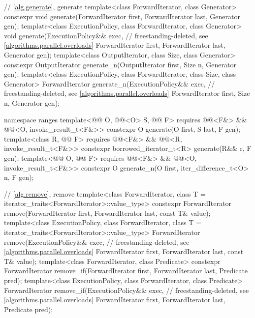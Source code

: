 \begin{codeblock}
{  // \ref{alg.generate}, generate
  template<class ForwardIterator, class Generator>
    constexpr void generate(ForwardIterator first, ForwardIterator last,
                            Generator gen);
  template<class ExecutionPolicy, class ForwardIterator, class Generator>
    void generate(ExecutionPolicy&& exec,                       // freestanding-deleted, see \ref{algorithms.parallel.overloads}
                  ForwardIterator first, ForwardIterator last,
                  Generator gen);
  template<class OutputIterator, class Size, class Generator>
    constexpr OutputIterator generate_n(OutputIterator first, Size n, Generator gen);
  template<class ExecutionPolicy, class ForwardIterator, class Size, class Generator>
    ForwardIterator generate_n(ExecutionPolicy&& exec,          // freestanding-deleted, see \ref{algorithms.parallel.overloads}
                               ForwardIterator first, Size n, Generator gen);

  namespace ranges {
    template<@@ O, @@<O> S, @@ F>
      requires @@<F&> && @@<O, invoke_result_t<F&>>
      constexpr O generate(O first, S last, F gen);
    template<class R, @@ F>
      requires @@<F&> && @@<R, invoke_result_t<F&>>
      constexpr borrowed_iterator_t<R> generate(R&& r, F gen);
    template<@@ O, @@ F>
      requires @@<F&> && @@<O, invoke_result_t<F&>>
      constexpr O generate_n(O first, iter_difference_t<O> n, F gen);
  }

  // \ref{alg.remove}, remove
  template<class ForwardIterator, class T = iterator_traits<ForwardIterator>::value_type>
    constexpr ForwardIterator remove(ForwardIterator first, ForwardIterator last,
                                     const T& value);
  template<class ExecutionPolicy, class ForwardIterator,
           class T = iterator_traits<ForwardIterator>::value_type>
    ForwardIterator remove(ExecutionPolicy&& exec,              // freestanding-deleted, see \ref{algorithms.parallel.overloads}
                           ForwardIterator first, ForwardIterator last,
                           const T& value);
  template<class ForwardIterator, class Predicate>
    constexpr ForwardIterator remove_if(ForwardIterator first, ForwardIterator last,
                                        Predicate pred);
  template<class ExecutionPolicy, class ForwardIterator, class Predicate>
    ForwardIterator remove_if(ExecutionPolicy&& exec,           // freestanding-deleted, see \ref{algorithms.parallel.overloads}
                              ForwardIterator first, ForwardIterator last,
                              Predicate pred);

}
\end{codeblock}
